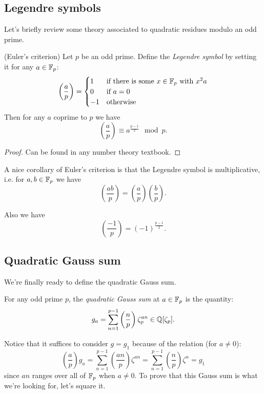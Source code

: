 \documentclass[utf8, letterpaper]{article}
\begin{document}
\subsection{Legendre symbols}

Let's briefly review some theory associated to quadratic residues modulo an odd prime.

\begin{theorem}{(Euler's criterion)}
    Let $p$ be an odd prime. Define the \emph{Legendre symbol} by setting it for any $a\in \mathbb{F}_p$:
    \[
        \left(\frac{a}{p}\right)=\begin{cases}
            1&\textrm{if there is some }x\in \mathbb{F}_p\textrm{ with }x^2 a\\
            0&\textrm{if }a=0\\
            -1&\textrm{otherwise}
        \end{cases}
    \] 
    Then for any $a$ coprime to $p$ we have
    \[
        \left(\frac{a}{p}\right)\equiv a^{\frac{p-1}{2}}\mod p
    .\] 
\end{theorem}
\begin{proof}
    Can be found in any number theory textbook.
\end{proof}

A nice corollary of Euler's criterion is that the Legendre symbol is multiplicative, i.e. for $a,b\in \mathbb{F}_p$ we have
\[
    \left(\frac{ab}{p}\right)=\left(\frac{a}{p}\right)\left(\frac{b}{p}\right)
.\] 

Also we have
\[
    \left(\frac{-1}{p}\right) = (-1)^{\frac{p-1}{2}}
.\]

\subsection{Quadratic Gauss sum}

We're finally ready to define the quadratic Gauss sum.
\begin{definition}
    For any odd prime $p$, the \emph{quadratic Gauss sum} at $a\in \mathbb{F}_p$ is the quantity:
    \[
        g_a = \sum^{p-1}_{n=1}\left(\frac{n}{p}\right)\zeta^{an}_p\in \mathbb{Q}[\zeta_p]
    .\] 
\end{definition}

Notice that it suffices to consider $g=g_1$ because of the relation (for $a\neq 0$):
\[
    \left(\frac{a}{p}\right)g_a = \sum^{p-1}_{n=1}\left(\frac{an}{p}\right)\zeta^{an}=\sum^{p-1}_{n=1}\left(\frac{n}{p}\right)\zeta^{n}=g_1
\]
since $an$ ranges over all of $\mathbb{F}_p$ when $a\neq 0$. To prove that this Gauss sum is what we're looking for, let's square it.
\end{document}
